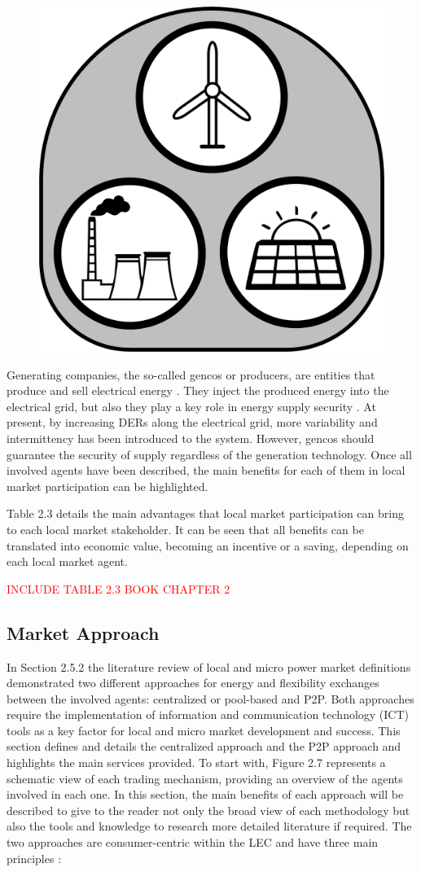 \begin{figure}
	\centering
	\includegraphics[width=0.1\columnwidth ]{ChapterIntro/Figures/Gencos.jpg}
	\label{gencos}  
\end{figure}


Generating companies, the so-called gencos or producers, are entities that produce and sell electrical energy \cite{Kirschen2004}. They inject the produced energy into the electrical grid, but also they play a key role in energy supply security \cite{USEFFoundation2015a}. At present, by increasing DERs along the electrical grid, more variability and intermittency has been introduced to the system. However, gencos should guarantee the security of supply regardless of the generation technology. Once all involved agents have been described, the main benefits for each of them in local market participation can be highlighted. 

Table 2.3 details the main advantages that local market participation can bring to each local market stakeholder. It can be seen that all benefits can be translated into economic value, becoming an incentive or a saving, depending on each local market agent.

\textcolor{red}{INCLUDE TABLE 2.3 BOOK CHAPTER 2}

\subsection{Market Approach}

In Section 2.5.2 the literature review of local and micro power market definitions demonstrated two different
approaches for energy and flexibility exchanges between the involved agents: centralized or pool-based and
P2P. Both approaches require the implementation of information and communication technology (ICT) tools
as a key factor for local and micro market development and success. This section defines and details the
centralized approach and the P2P approach and highlights the main services provided. To start with, Figure 2.7
represents a schematic view of each trading mechanism, providing an overview of the agents involved in
each one. In this section, the main benefits of each approach will be described to give to the reader not only
the broad view of each methodology but also the tools and knowledge to research more detailed literature if
required. The two approaches are consumer-centric within the LEC and have three main principles \cite{sousa2018peer}:

